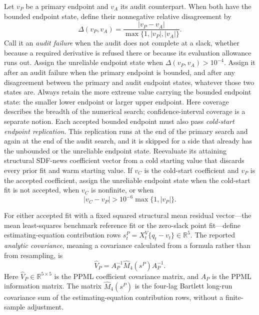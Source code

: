 \documentclass[11pt]{article}
\begin{document}
Let \(v_P\) be a primary endpoint and \(v_A\) its audit counterpart. When both have the bounded
endpoint state, define their nonnegative relative disagreement by
\begin{equation*}
 \Delta(v_P,v_A)=\frac{|v_P-v_A|}{\max\{1,|v_P|,|v_A|\}}.
\end{equation*}
Call it an \emph{audit failure} when the audit does not complete at a slack, whether because a
required derivative is refused there or because its evaluation allowance runs out.
Assign the unreliable endpoint state when \(\Delta(v_P,v_A)>10^{-4}\). Assign it after an audit
failure when the primary endpoint is bounded, and after any disagreement between the primary and
audit endpoint states, whatever those two states are. Always retain the
more extreme value carrying the bounded endpoint state: the smaller lower endpoint or larger upper endpoint.
Here coverage describes the breadth of the numerical search; confidence-interval coverage is a
separate notion. Each accepted bounded endpoint must also pass \emph{cold-start endpoint replication}.
This replication runs at the end of the primary search and again at the end of the audit search, and
it is skipped for a side that already has the unbounded or the unreliable endpoint state.
Reevaluate its attaining structural SDF-news coefficient vector from a cold starting value that discards every
prior fit and warm starting value. If \(v_C\) is the cold-start coefficient and \(v_P\) is the accepted
coefficient, assign the unreliable endpoint state when the cold-start fit is not accepted, when
\(v_C\) is nonfinite, or when
\begin{equation*}
 |v_C-v_P|>10^{-6}\max\{1,|v_P|\}.
\end{equation*}

For either accepted fit with a fixed squared structural mean residual vector---the mean least-squares benchmark
reference fit or the zero-slack point fit---define estimating-equation contribution rows
\(s^P_t=X_t^V\{q_t-v_t\}\in\mathbb R^5\). The reported \emph{analytic covariance}, meaning
a covariance calculated from a formula rather than from resampling, is
\begin{equation*}
 \widehat V_P=A_P^{-1}\widehat M_4(s^P)A_P^{-1}.
\end{equation*}
Here \(\widehat V_P\in\mathbb R^{5\times5}\) is the PPML coefficient covariance matrix, and
\(A_P\) is the PPML information matrix. The matrix \(\widehat M_4(s^P)\) is the four-lag Bartlett
long-run covariance sum of the estimating-equation contribution rows, without a finite-sample
adjustment.
\end{document}
